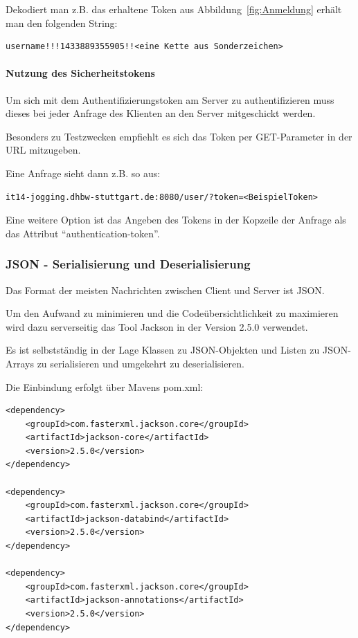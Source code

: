 Dekodiert man z.B.  das erhaltene Token aus Abbildung~\ref{fig:Anmeldung} erhält man den folgenden String:
\begin{lstlisting}
username!!!1433889355905!!<eine Kette aus Sonderzeichen>
\end{lstlisting}
\paragraph{Nutzung des Sicherheitstokens}
Um sich mit dem Authentifizierungstoken am Server zu authentifizieren muss dieses bei jeder Anfrage des Klienten an den Server mitgeschickt werden.

Besonders zu Testzwecken empfiehlt es sich das Token per GET-Parameter in der URL mitzugeben. 

Eine Anfrage sieht dann z.B. so aus:
\begin{lstlisting}
it14-jogging.dhbw-stuttgart.de:8080/user/?token=<BeispielToken>
\end{lstlisting}

Eine weitere Option ist das Angeben des Tokens in der Kopzeile der Anfrage als das Attribut  ``authentication-token''.
\subsubsection{JSON - Serialisierung und Deserialisierung}\label{jackson}
Das Format der meisten Nachrichten zwischen Client und Server ist JSON.

Um den Aufwand zu minimieren und die Codeübersichtlichkeit zu maximieren wird dazu serverseitig das Tool Jackson in der Version 2.5.0 verwendet.

Es ist selbstständig in der Lage Klassen zu JSON-Objekten und Listen zu JSON-Arrays zu serialisieren und umgekehrt zu deserialisieren.

Die Einbindung erfolgt über Mavens pom.xml:
\lstset{language=xml}
\begin{lstlisting}[frame=htrbl, caption={Jacksons Abhängigkeiten in Maven}, breaklines=true]
<dependency>
	<groupId>com.fasterxml.jackson.core</groupId>
	<artifactId>jackson-core</artifactId>
	<version>2.5.0</version>
</dependency>

<dependency>
	<groupId>com.fasterxml.jackson.core</groupId>
	<artifactId>jackson-databind</artifactId>
	<version>2.5.0</version>
</dependency>

<dependency>
	<groupId>com.fasterxml.jackson.core</groupId>
	<artifactId>jackson-annotations</artifactId>
	<version>2.5.0</version>
</dependency>
\end{lstlisting}

